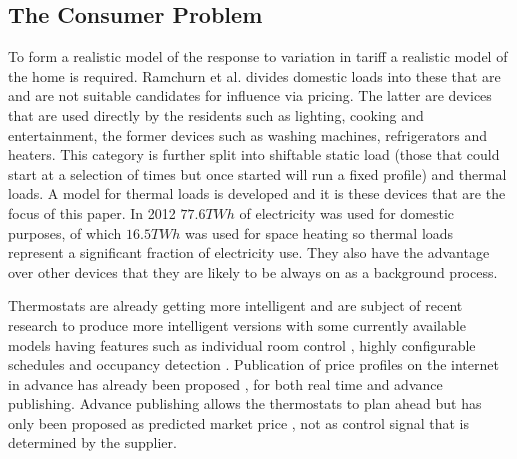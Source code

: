 \documentclass[a4paper, 10 pt, conference]{ieeeconf}  %
\begin{document}




\subsection{The Consumer Problem}
To form a realistic model of the response to variation in tariff a realistic model of the home is required. Ramchurn et al. \cite{ramchurn2011agent} divides domestic loads into these that are and are not suitable candidates for influence via pricing. The latter are devices that are used directly by the residents such as lighting, cooking and entertainment, the former devices such as washing machines, refrigerators and heaters. This category is further split into shiftable static load (those that could start at a selection of times but once started will run a fixed profile) and thermal loads. A model for thermal loads is developed and it is these devices that are the focus of this paper. In 2012 $77.6 TWh$ of electricity was used for domestic purposes, of which $16.5 TWh$ was used for space heating \cite{ecuk_data} so thermal loads represent a significant fraction of electricity use. They also have the advantage over other devices that they are likely to be always on as a background process.

Thermostats are already getting more intelligent and are subject of recent research to produce more intelligent versions \cite{rogers2011adaptive} \cite{ramchurn2013agentswitch} with some currently available models having features such as individual room control \cite{honeywell}, highly configurable schedules \cite{nest} and occupancy detection \cite{tado}. Publication of price profiles on the internet in advance has already been proposed \cite{ramchurn2011agenthomeo}, for both real time and advance publishing. Advance publishing allows the thermostats to plan ahead but has only been proposed as predicted market price \cite{rogers2011adaptive}, not as control signal that is determined by the supplier.
\end{document}
